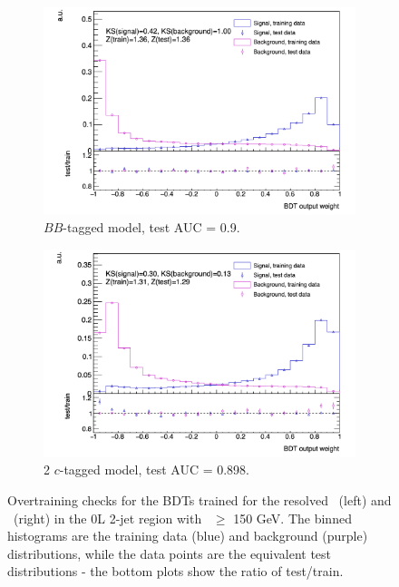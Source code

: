 \begin{figure}[h!]
  \hspace{-0.3cm}
  \begin{subfigure}[b]{0.49\textwidth}
      \centering
    \includegraphics[width=\textwidth]{Images/VH/Discriminants/0Lbb.png}
  \caption{$BB$-tagged model, test AUC = 0.9.} 
  \end{subfigure}
  \begin{subfigure}[b]{0.49\textwidth}
      \centering
    \includegraphics[width=\textwidth]{Images/VH/Discriminants/0Lcc.png}
    \caption{2 $c$-tagged model, test AUC = 0.898.}
  \end{subfigure}
  \caption{Overtraining checks for the BDTs trained for the resolved \vhb\ (left) and \vhc\ (right) in the 0L 2-jet region with \ptv\ $\geq$ 150 GeV. The binned histograms are the training data (blue) and background (purple) distributions, while the data points are the equivalent test distributions - the bottom plots show the ratio of test/train.}
  \label{fig:overtrainingCheck}
\end{figure}


